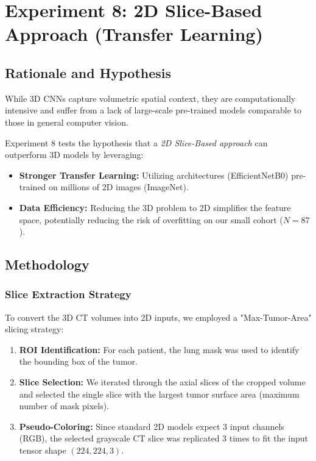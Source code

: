 \usepackage{graphicx}  %
\usepackage{multirow}  %
\usepackage{array}
\section{Experiment 8: 2D Slice-Based Approach (Transfer Learning)}

\subsection{Rationale and Hypothesis}
While 3D CNNs capture volumetric spatial context, they are computationally intensive and suffer from a lack of large-scale pre-trained models comparable to those in general computer vision. 

Experiment 8 tests the hypothesis that a \textit{2D Slice-Based approach} can outperform 3D models by leveraging:
\begin{itemize}
    \item \textbf{Stronger Transfer Learning:} Utilizing architectures (EfficientNetB0) pre-trained on millions of 2D images (ImageNet).
    \item \textbf{Data Efficiency:} Reducing the 3D problem to 2D simplifies the feature space, potentially reducing the risk of overfitting on our small cohort ($N=87$).
\end{itemize}

\subsection{Methodology}

\subsubsection{Slice Extraction Strategy}
To convert the 3D CT volumes into 2D inputs, we employed a "Max-Tumor-Area" slicing strategy:
\begin{enumerate}
    \item \textbf{ROI Identification:} For each patient, the lung mask was used to identify the bounding box of the tumor.
    \item \textbf{Slice Selection:} We iterated through the axial slices of the cropped volume and selected the single slice with the largest tumor surface area (maximum number of mask pixels).
    \item \textbf{Pseudo-Coloring:} Since standard 2D models expect 3 input channels (RGB), the selected grayscale CT slice was replicated 3 times to fit the input tensor shape $(224, 224, 3)$.
\end{enumerate}

